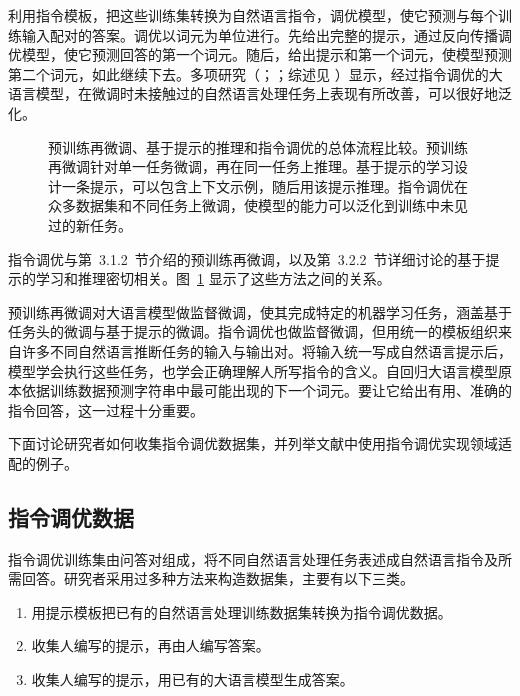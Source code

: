 利用指令模板，把这些训练集转换为自然语言指令，调优模型，使它预测与每个训练输入配对的答案。调优以词元为单位进行。先给出完整的提示，通过反向传播调优模型，使它预测回答的第一个词元。随后，给出提示和第一个词元，使模型预测第二个词元，如此继续下去。多项研究（；；综述见 ）显示，经过指令调优的大语言模型，在微调时未接触过的自然语言处理任务上表现有所改善，可以很好地泛化。

\begin{figure}[!htbp]
\centering

\caption{预训练再微调、基于提示的推理和指令调优的总体流程比较。预训练再微调针对单一任务微调，再在同一任务上推理。基于提示的学习设计一条提示，可以包含上下文示例，随后用该提示推理。指令调优在众多数据集和不同任务上微调，使模型的能力可以泛化到训练中未见过的新任务。}
\label{fig:ch04-workflows}
\end{figure}

指令调优与第~3.1.2~节介绍的预训练再微调，以及第~3.2.2~节详细讨论的基于提示的学习和推理密切相关。图~\ref{fig:ch04-workflows} 显示了这些方法之间的关系。

\begin{keypoint}
预训练再微调对大语言模型做监督微调，使其完成特定的机器学习任务，涵盖基于任务头的微调与基于提示的微调。指令调优也做监督微调，但用统一的模板组织来自许多不同自然语言推断任务的输入与输出对。将输入统一写成自然语言提示后，模型学会执行这些任务，也学会正确理解人所写指令的含义。自回归大语言模型原本依据训练数据预测字符串中最可能出现的下一个词元。要让它给出有用、准确的指令回答，这一过程十分重要。
\end{keypoint}

下面讨论研究者如何收集指令调优数据集，并列举文献中使用指令调优实现领域适配的例子。

\subsection{指令调优数据}
指令调优训练集由问答对组成，将不同自然语言处理任务表述成自然语言指令及所需回答。研究者采用过多种方法来构造数据集，主要有以下三类。

\begin{enumerate}
\item 用提示模板把已有的自然语言处理训练数据集转换为指令调优数据。
\item 收集人编写的提示，再由人编写答案。
\item 收集人编写的提示，用已有的大语言模型生成答案。
\end{enumerate}

